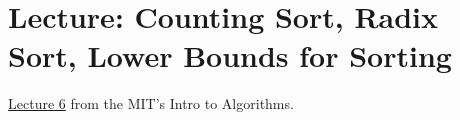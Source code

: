 \chapter{Lecture: Counting Sort, Radix Sort, Lower Bounds for Sorting}
\href{https://ocw.mit.edu/courses/electrical-engineering-and-computer-science/6-006-introduction-to-algorithms-fall-2011/lecture-videos/lecture-7-counting-sort-radix-sort-lower-bounds-for-sorting/}{Lecture 6} 
from the MIT's  Intro to Algorithms.
